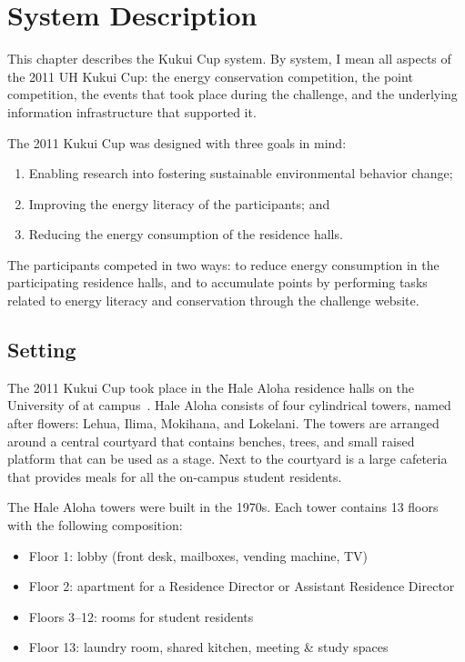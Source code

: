 \chapter{System Description}
\label{cha:system-description}

This chapter describes the Kukui Cup system. By system, I mean all aspects of the 2011 UH Kukui Cup: the energy conservation competition, the point competition, the events that took place during the challenge, and the underlying information infrastructure that supported it.

The 2011 Kukui Cup was designed with three goals in mind:

\begin{enumerate}
	\item Enabling research into fostering sustainable environmental behavior change;
	\item Improving the energy literacy of the participants; and
	\item Reducing the energy consumption of the residence halls.
\end{enumerate}

The participants competed in two ways: to reduce energy consumption in the participating residence halls, and to accumulate points by performing tasks related to energy literacy and conservation through the challenge website.

\section{Setting}
\label{sec:setting}

The 2011 Kukui Cup took place in the Hale Aloha residence halls on the University of \Hawaii at \Manoa campus~\cite{hale-aloha-website}. Hale Aloha consists of four cylindrical towers, named after \Hawaiian flowers: Lehua, Ilima, Mokihana, and Lokelani. The towers are arranged around a central courtyard that contains benches, trees, and small raised platform that can be used as a stage. Next to the courtyard is a large cafeteria that provides meals for all the on-campus student residents.

The Hale Aloha towers were built in the 1970s. Each tower contains 13 floors with the following composition:

\begin{itemize}
	\item Floor 1: lobby (front desk, mailboxes, vending machine, TV)
	\item Floor 2: apartment for a Residence Director or Assistant Residence Director
	\item Floors 3--12: rooms for student residents
	\item Floor 13: laundry room, shared kitchen, meeting \& study spaces
\end{itemize}

